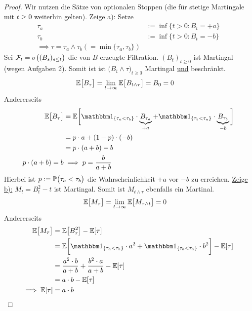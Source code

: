 \begin{proof}
	Wir nutzen die Sätze  von optionalen Stoppen (die für stetige Martingale mit $t\geq0$ weiterhin gelten).\nl
	\underline{Zeige a):}
	Setze
	\begin{align*}
		\tau_a&:=\inf\limits\big\lbrace t>0:B_t=+a\big\rbrace\\
		\tau_b&:=\inf\limits\big\lbrace t>0:B_t=-b\big\rbrace\\
		\implies\tau=\tau_a\wedge\tau_b(=\min\lbrace\tau_a,\tau_b\rbrace)
	\end{align*}
	Sei $\F_t=\sigma\big((B_s)_{s\leq t}\big)$ die von $B$ erzeugte Filtration.
	$(B_t)_{t\geq0}$ ist Martingal (wegen Aufgaben 2).
	Somit ist ist $\big(B_t\wedge\tau\big)_{t\geq0}$ Martingal \underline{und} beschränkt.
	\begin{align*}
		\E\big[B_\tau\big]
		&=\lim\limits_{t\to\infty}\E\big[B_{t\wedge\tau}\big]=B_0=0
	\end{align*}
	Andererseits
	\begin{align*}
		\E\big[B_\tau\big]
		&=\E\bigg[\indi_{\lbrace\tau_a<\tau_b\rbrace}\cdot\underbrace{B_{\tau_a}}_{+a}+\indi_{\lbrace\tau_b<\tau_a\rbrace}\cdot\underbrace{B_{\tau_b}}_{-b}\bigg]\\
		&=p\cdot a+(1-p)\cdot(-b)\\
		&=p\cdot(a+b)-b\\
		p\cdot(a+b)=b&\implies p=\frac{b}{a+b}
	\end{align*}
	Hierbei ist $p:=\P\big(\tau_a<\tau_b\big)$ die Wahrscheinlichkeit $+a$ vor $-b$ zu erreichen.\nl
	\underline{Zeige b):}
	$M_t=B_t^2-t$ ist Martingal.
	Somit ist $M_{t\wedge\tau}$ ebenfalls ein Martinal.
	\begin{align*}
		\E\big[M_\tau\big]
		&=\lim\limits_{t\to\infty}\E\big[M_{\tau\wedge t}\big]=0
	\end{align*}
	Andererseits
	\begin{align*}
		\E\big[M_\tau\big]
		&=\E\big[B_\tau^2\big]-\E[\tau]\\
		&=\E\bigg[\indi_{\lbrace\tau_a<\tau_b\rbrace}\cdot a^2+\indi_{\lbrace\tau_b<\tau_a\rbrace}\cdot b^2\bigg]-\E[\tau]\\
		&=\frac{a^2\cdot b}{a+b}+\frac{b^2\cdot a}{a+b}-\E[\tau]\\
		&=a\cdot b-\E[\tau]\\
		\implies \E[\tau]&=a\cdot b
	\end{align*}
\end{proof}

